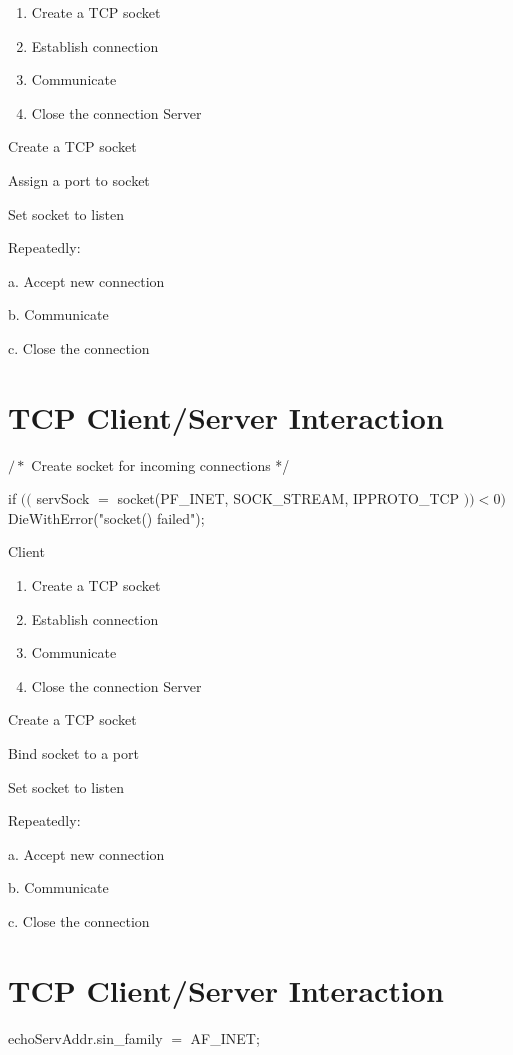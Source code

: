 \documentclass[10pt]{article}
\begin{document}
\begin{enumerate}
  \item Create a TCP socket

  \item Establish connection

  \item Communicate

  \item Close the connection Server

\end{enumerate}

Create a TCP socket

Assign a port to socket

Set socket to listen

Repeatedly:

a. Accept new connection

b. Communicate

c. Close the connection

\section{TCP Client/Server Interaction}
$/ *$ Create socket for incoming connections */

if $(($ servSock $=$ socket(PF\_INET, SOCK\_STREAM, IPPROTO\_TCP $))<0)$ DieWithError("socket() failed");

Client

\begin{enumerate}
  \item Create a TCP socket

  \item Establish connection

  \item Communicate

  \item Close the connection Server

\end{enumerate}

Create a TCP socket

Bind socket to a port

Set socket to listen

Repeatedly:

a. Accept new connection

b. Communicate

c. Close the connection

\section{TCP Client/Server Interaction}
echoServAddr.sin\_family $=$ AF\_INET;
\end{document}
